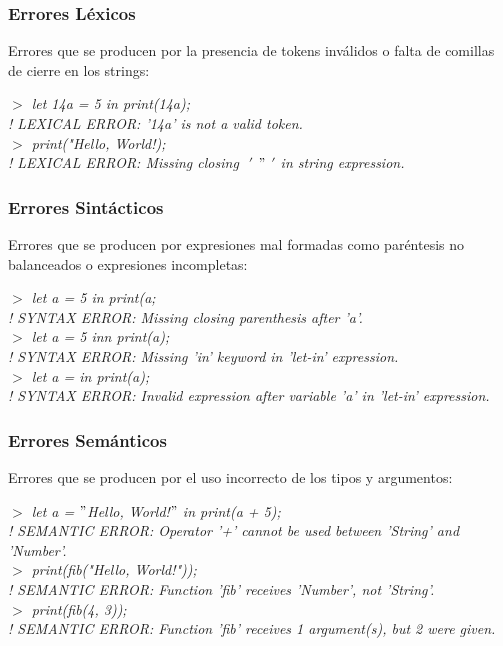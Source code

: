 \documentclass[12pt]{article}
\newcommand{\ini}{$>$ }
\begin{document}
\subsubsection*{Errores Léxicos}
	Errores que se producen por la presencia de tokens inválidos o falta de comillas de cierre en los strings:
	
	\emph{\ini let 14a = 5 in print(14a); \\
	! LEXICAL ERROR: '14a' is not a valid token. \\
	\ini print("Hello, World!); \\
	! LEXICAL ERROR: Missing closing $ $ $'$ $"$ $'$ in string expression.}

\subsubsection*{Errores Sintácticos}
	Errores que se producen por expresiones mal formadas como paréntesis no balanceados o expresiones incompletas:
	
	\emph{
	\ini let a = 5 in print(a; \\
	! SYNTAX ERROR: Missing closing parenthesis after 'a'. \\
	\ini let a = 5 inn print(a); \\
	! SYNTAX ERROR: Missing 'in' keyword in 'let-in' expression. \\
	\ini let a = in print(a); \\
	! SYNTAX ERROR: Invalid expression after variable 'a' in 'let-in' expression.
	}

\subsubsection*{Errores Semánticos}
	Errores que se producen por el uso incorrecto de los tipos y argumentos:
	
	\emph{
	\ini let a = $"$Hello, World!$"$ in print(a + 5); \\
	! SEMANTIC ERROR: Operator '+' cannot be used between 'String' and 'Number'. \\
	\ini print(fib("Hello, World!")); \\
	! SEMANTIC ERROR: Function 'fib' receives 'Number', not 'String'. \\
	\ini print(fib(4, 3)); \\
	! SEMANTIC ERROR: Function 'fib' receives 1 argument(s), but 2 were given.
	}

	
\end{document}
